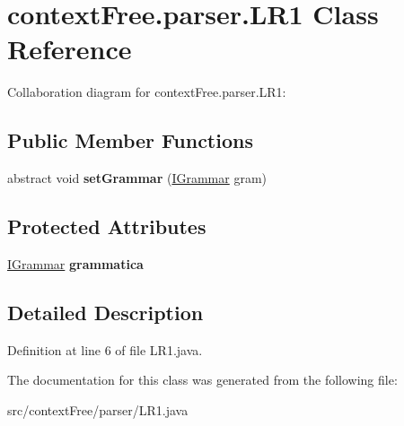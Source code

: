 \hypertarget{classcontext_free_1_1parser_1_1_l_r1}{\section{context\-Free.\-parser.\-L\-R1 Class Reference}
\label{classcontext_free_1_1parser_1_1_l_r1}
}


Collaboration diagram for context\-Free.\-parser.\-L\-R1\-:
\subsection*{Public Member Functions}
\begin{DoxyCompactItemize}
\item 
\hypertarget{classcontext_free_1_1parser_1_1_l_r1_a464d377de8e3484383068a547208dab5}{abstract void {\bfseries set\-Grammar} (\hyperlink{interfacecontext_free_1_1grammar_1_1_i_grammar}{I\-Grammar} gram)}\label{classcontext_free_1_1parser_1_1_l_r1_a464d377de8e3484383068a547208dab5}

\end{DoxyCompactItemize}
\subsection*{Protected Attributes}
\begin{DoxyCompactItemize}
\item 
\hypertarget{classcontext_free_1_1parser_1_1_l_r1_a1639494e6b5ede7a4e9b6e4c24fd1702}{\hyperlink{interfacecontext_free_1_1grammar_1_1_i_grammar}{I\-Grammar} {\bfseries grammatica}}\label{classcontext_free_1_1parser_1_1_l_r1_a1639494e6b5ede7a4e9b6e4c24fd1702}

\end{DoxyCompactItemize}


\subsection{Detailed Description}


Definition at line 6 of file L\-R1.\-java.



The documentation for this class was generated from the following file\-:\begin{DoxyCompactItemize}
\item 
src/context\-Free/parser/L\-R1.\-java\end{DoxyCompactItemize}

